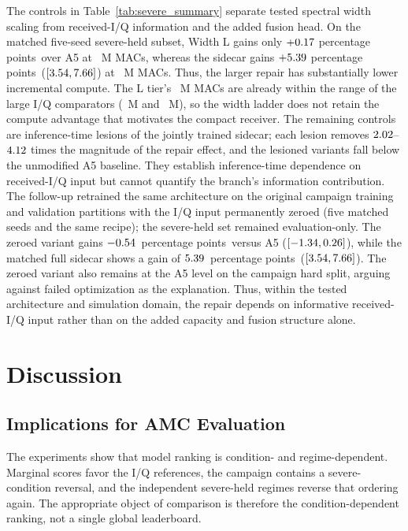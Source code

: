 \documentclass[letterpaper,journal]{IEEEtran}
\newcommand{\pp}{percentage points}
\begin{document}
The controls in Table~\ref{tab:severe_summary} separate tested
spectral width scaling from received-I/Q information and the added fusion
head. On the matched five-seed severe-held subset, Width L gains only
$+0.17$ \pp\ over A5 at \CapacityLMacs\ M MACs, whereas the
sidecar gains $+5.39$ \pp\
($[3.54,7.66]$) at
\SidecarMacsTotal\ M MACs. Thus, the larger repair has substantially lower
incremental compute. The L tier's \CapacityLMacs\ M MACs are already within the
range of the large I/Q comparators (\MacsIQFormer\ M and \MacsMCLDNN\ M), so
the width ladder does not retain the compute advantage that motivates the
compact receiver. The remaining controls are
inference-time lesions of the jointly trained sidecar; each lesion removes
$2.02$--$4.12$
times the magnitude of the repair effect, and the lesioned variants fall
below the unmodified A5 baseline. They establish inference-time dependence
on received-I/Q input but cannot quantify the branch's information
contribution. The follow-up retrained the same architecture on the original
campaign training and validation partitions with the I/Q input permanently
zeroed (five matched seeds and the same recipe); the severe-held set remained
evaluation-only. The zeroed variant gains
$-0.54$~\pp\ versus A5
($[-1.34,0.26]$), while the
matched full sidecar shows a gain of $5.39$~\pp\
($[3.54,7.66]$). The zeroed variant
also remains at the A5 level on the campaign hard split, arguing against failed
optimization as the explanation. Thus, within the tested architecture and simulation
domain, the repair depends on informative received-I/Q input rather than on
the added capacity and fusion structure alone.

\section{Discussion}
\subsection{Implications for AMC Evaluation}
The experiments show that model ranking is condition- and regime-dependent.
Marginal scores favor the I/Q references, the campaign contains a
severe-condition reversal, and the independent severe-held regimes reverse
that ordering again. The appropriate object of comparison is therefore the
condition-dependent ranking, not a single global leaderboard.
\end{document}
